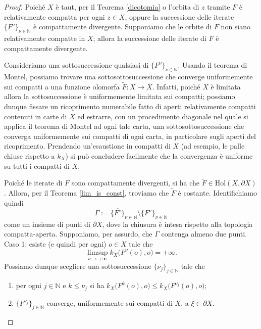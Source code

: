 \begin{proof}
    Poiché $X$ è taut, per il Teorema \ref{dicotomia} o l'orbita di $z$ tramite $F$ è relativamente compatta per ogni $z \in X$, oppure la successione delle iterate $\{F^\nu\}_{\nu\in\mathbb{N}}$ è compattamente divergente. Supponiamo che le orbite di $F$ non siano relativamente compatte in $X$; allora la successione delle iterate di $F$ è compattamente divergente.

    Consideriamo una sottosuccessione qualsiasi di $\{F^\nu\}_{\nu\in\mathbb{N}}$. Usando il teorema di Montel, possiamo trovare una sottosottosuccessione che converge uniformemente sui compatti a una funzione olomorfa $\tilde{F}:X \rightarrow \overline{X}$. Infatti, poiché $X$ è limitata allora la sottosuccessione è uniformemente limitata sui compatti; possiamo dunque fissare un ricoprimento numerabile fatto di aperti relativamente compatti contenuti in carte di $X$ ed estrarre, con un procedimento diagonale nel quale si applica il teorema di Montel ad ogni tale carta, una sottosottosuccessione che converga uniformemente sui compatti di ogni carta, in particolare sugli aperti del ricoprimento. Prendendo un'esaustione in compatti di $X$ (ad esempio, le palle chiuse rispetto a $k_X$) si può concludere facilmente che la convergenza è uniforme su tutti i compatti di $X$.

    Poiché le iterate di $F$ sono compattamente divergenti, si ha che $\tilde{F}\in\text{Hol}(X,\partial X)$. Allora, per il Teorema \ref{lim_is_const}, troviamo che $\tilde{F}$ è costante. Identifichiamo quindi
    $$\Gamma:=\overline{\{F^\nu\}}_{\nu\in\mathbb{N}}\setminus\{F^\nu\}_{\nu\in\mathbb{N}}$$
    come un insieme di punti di $\partial X$, dove la chiusura è intesa rispetto alla topologia compatta-aperta. Supponiamo, per assurdo, che $\Gamma$ contenga almeno due punti. \\

    Caso 1: esiste (e quindi per ogni) $o \in X$ tale che
    $$\limsup_{\nu\longrightarrow+\infty} k_X\big(F^\nu(o),o\big)=+\infty.$$
    Possiamo dunque scegliere una sottosuccessione $\{\nu_j\}_{j\in\mathbb{N}}$ tale che
    \begin{enumerate}[label={(\arabic*)}]
        \item per ogni $j\in\mathbb{N}$ e $k\le\nu_j$ si ha $k_X\big(F^k(o),o\big) \le k_X\big(F^{\nu_j}(o),o\big)$;
        \item $\{F^{\nu_j}\}_{j\in\mathbb{N}}$ converge, uniformemente sui compatti di $X$, a $\xi\in\partial X$.
    \end{enumerate}


\end{proof}
